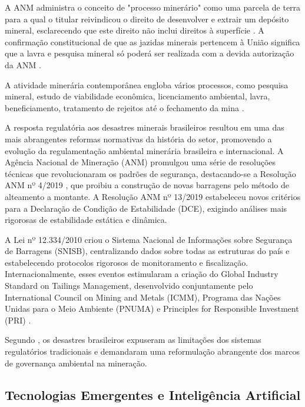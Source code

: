 A ANM administra o conceito de "processo minerário" como uma parcela de terra para a qual o titular reivindicou o direito de desenvolver e extrair um depósito mineral, esclarecendo que este direito não inclui direitos à superfície \cite{jazida2022leis}. A confirmação constitucional de que as jazidas minerais pertencem à União significa que a lavra e pesquisa mineral só poderá ser realizada com a devida autorização da ANM \cite{jazida2022leis}.

A atividade minerária contemporânea engloba vários processos, como pesquisa mineral, estudo de viabilidade econômica, licenciamento ambiental, lavra, beneficiamento, tratamento de rejeitos até o fechamento da mina \cite{jazida2022leis}.

A resposta regulatória aos desastres minerais brasileiros resultou em uma das mais abrangentes reformas normativas da história do setor, promovendo a evolução da regulamentação ambiental minerária brasileira e internacional. A Agência Nacional de Mineração (ANM) promulgou uma série de resoluções técnicas que revolucionaram os padrões de segurança, destacando-se a Resolução ANM nº 4/2019 \cite{anm2019resolucao4}, que proibiu a construção de novas barragens pelo método de alteamento a montante. A Resolução ANM nº 13/2019 \cite{anm2019resolucao13} estabeleceu novos critérios para a Declaração de Condição de Estabilidade (DCE), exigindo análises mais rigorosas de estabilidade estática e dinâmica.

A Lei nº 12.334/2010 criou o Sistema Nacional de Informações sobre Segurança de Barragens (SNISB), centralizando dados sobre todas as estruturas do país e estabelecendo protocolos rigorosos de monitoramento e fiscalização. Internacionalmente, esses eventos estimularam a criação do Global Industry Standard on Tailings Management, desenvolvido conjuntamente pelo International Council on Mining and Metals (ICMM), Programa das Nações Unidas para o Meio Ambiente (PNUMA) e Principles for Responsible Investment (PRI) \cite{icmm2020global}.

Segundo , os desastres brasileiros expuseram as limitações dos sistemas regulatórios tradicionais e demandaram uma reformulação abrangente dos marcos de governança ambiental na mineração.

\subsection{Tecnologias Emergentes e Inteligência Artificial}

